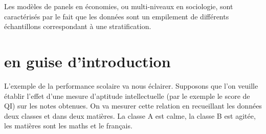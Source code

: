 \documentclass[
]{book}
\begin{document}
Les modèles de panels en économies, ou multi-niveaux en sociologie, sont caractérisés par le fait que les données sont un empilement de différents échantillons correspondant à une stratification.

\hypertarget{en-guise-dintroduction-1}{%
\section{en guise d'introduction}\label{en-guise-dintroduction-1}}

L'exemple de la performance scolaire va nous éclairer. Supposons que l'on veuille établir l'effet d'une mesure d'aptitude intellectuelle (par le exemple le score de QI) sur les notes obtenues. On va mesurer cette relation en recueillant les données deux classes et dans deux matières. La classe A est calme, la classe B est agitée, les matières sont les maths et le français.
\end{document}

